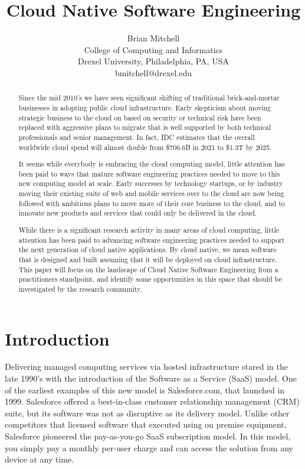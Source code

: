 \documentclass[conference]{IEEEconf}
\title{ 
        	Cloud Native Software Engineering 
      }
\author{
			Brian Mitchell\\
			College of Computing and Informatics\\
			Drexel University, Philadelphia, PA, USA\\
			bmitchell@drexel.edu
}
\date{}
\begin{document}
%

\maketitle

\thispagestyle{empty}


\begin{abstract}
Since the mid 2010's we have seen significant shifting of traditional brick-and-mortar businesses in adopting public cloud infrastructure.  Early skepticism about moving strategic business to the cloud on based on security or technical risk have been replaced with aggressive plans to migrate that is well supported by both technical professionals and senior management. In fact, IDC estimates that the overall worldwide cloud spend will almost double from \$706.6B in 2021 to \$1.3T by 2025\cite{IDCReport}.  

It seems while everybody is embracing the cloud computing model, little attention has been paid to ways that mature software engineering practices needed to move to this new computing model at scale. Early successes by technology startups, or by industry moving their existing suite of web and mobile services over to the cloud are now being followed with ambitious plans to move more of their core business to the cloud, and to innovate new products and services that could only be delivered in the cloud.

While there is a significant research activity in many areas of cloud computing, little attention has been paid to advancing software engineering practices needed to support the next generation of cloud native applications.  By cloud native, we mean software that is designed and built assuming that it will be deployed on cloud infrastructure. This paper will focus on the landscape of Cloud Native Software Engineering from a practitioners standpoint, and  identify some opportunities in this space that should be investigated by the research community.
\end{abstract}  



\section{Introduction}
\label{Intro}

Delivering managed computing services via hosted infrastructure stared in the late 1990's with the introduction of the Software as a Service (SaaS) model. One of the earliest examples of this new model is Salesforce.com, that launched in 1999\cite{SalesforceHistory}.  Salesforce offered a best-in-class customer relationship management (CRM) suite, but its software was not as disruptive as its delivery model. Unlike other competitors that licensed software that executed using on premise equipment, Salesforce pioneered the pay-as-you-go SaaS subscription model. In this model, you simply pay a monthly per-user charge and can access the solution from any device at any time.     
\end{document}

